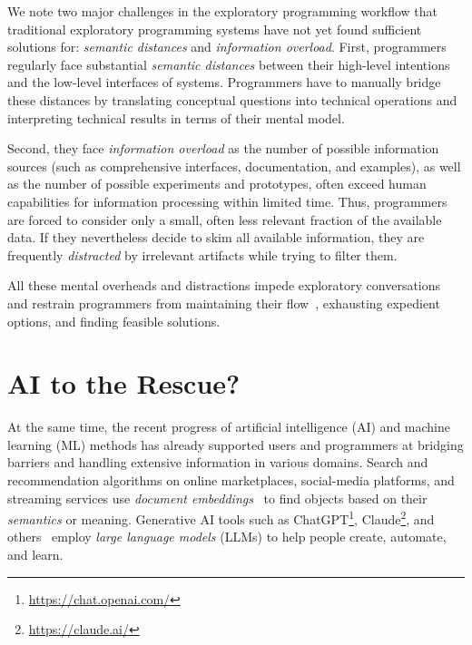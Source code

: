 We note two major challenges in the exploratory programming workflow that traditional exploratory programming systems have not yet found sufficient solutions for: \emph{semantic distances} and \emph{information overload}.
First, programmers regularly face substantial \emph{semantic distances} between their high-level intentions and the low-level interfaces of systems.
Programmers have to manually bridge these distances by translating conceptual questions into technical operations and interpreting technical results in terms of their mental model.

Second, they face \emph{information overload} as the number of possible information sources (such as comprehensive interfaces, documentation, and examples), as well as the number of possible experiments and prototypes, often exceed human capabilities for information processing within limited time.
Thus, programmers are forced to consider only a small, often less relevant fraction of the available data.
If they nevertheless decide to skim all available information, they are frequently \emph{distracted} by irrelevant artifacts while trying to filter them.

All these mental overheads and distractions impede exploratory conversations and restrain programmers from maintaining their flow~\cite{csikszentmihalyi2008flow}, exhausting expedient options, and finding feasible solutions.

\section*{AI to the Rescue?}

At the same time, the recent progress of artificial intelligence (AI) and machine learning (ML) methods has already supported users and programmers at bridging barriers and handling extensive information in various domains.
Search and recommendation algorithms on online marketplaces, social-media platforms, and streaming services use \emph{document embeddings}~\cite{mikolov2013efficient,devlin2019bert} to find objects based on their \emph{semantics} or meaning. %
Generative AI tools such as ChatGPT\footnote{\url{https://chat.openai.com/}}, Claude\footnote{\url{https://claude.ai/}}, and others~\cite{vaswani2017attention,radford2018improving,zhao2023survey} employ \emph{large language models} (LLMs) to help people create, automate, and learn. %

